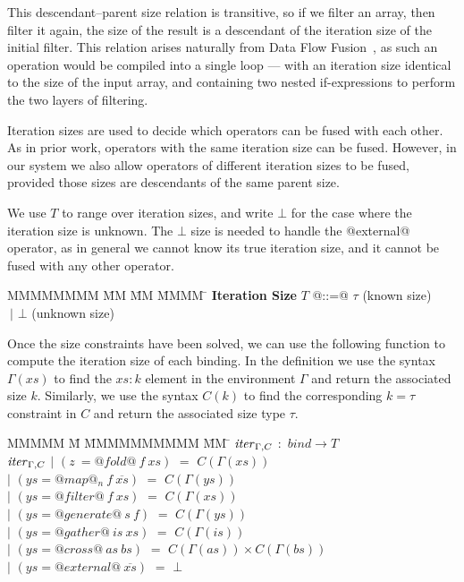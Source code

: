 This descendant--parent size relation is transitive, so if we filter an array, then filter it again, the size of the result is a descendant of the iteration size of the initial filter. This relation arises naturally from Data Flow Fusion~\cite{lippmeier2013flow}, as such an operation would be compiled into a single loop --- with an iteration size identical to the size of the input array, and containing two nested if-expressions to perform the two layers of filtering.

Iteration sizes are used to decide which operators can be fused with each other. As in prior work, operators with the same iteration size can be fused. However, in our system we also allow operators of different iteration sizes to be fused, provided those sizes are descendants of the same parent size.

We use $T$ to range over iteration sizes, and write $\bot$ for the case where the iteration size is unknown. The $\bot$ size is needed to handle the @external@ operator, as in general we cannot know its true iteration size, and it cannot be fused with any other operator.

\begin{tabbing}
MMMMMMMM \= MM       \= MM \= MMMM \= \kill
\textbf{Iteration Size}
 \> $T$         \> @::=@  \> $\tau$        \> (known size) \\
 \>             \> $~|$   \> $\bot$     \> (unknown size) \\
\end{tabbing}

Once the size constraints have been solved, we can use the following function to compute the iteration size of each binding. In the definition we use the syntax $\Gamma(xs)$ to find the $xs : k$ element in the environment $\Gamma$ and return the associated size $k$. Similarly, we use the syntax $C(k)$ to find the corresponding $k = \tau$ constraint in $C$ and return the associated size type $\tau$.


\begin{tabbing}
MMMMM \= M \= MMMMMMMMMM \= MM \= \kill
$\mathit{iter}_{\Gamma,C}$  
        \>$:$\> $bind \rightarrow T$ 
\\[1ex]
$\mathit{iter}_{\Gamma,C}$
        \> $|$  \> $(z~ = @fold@~ f~xs)$     
                \> $=$ \> $C(\Gamma(xs))$ 
\\
        \> $|$  \> $(ys = @map@_n~f~\overline{xs})$
                \> $=$ \> $C(\Gamma(ys))$ 
\\
        \> $|$  \> $(ys = @filter@~f~xs)$    
                \> $=$ \> $C(\Gamma(xs))$ 
\\
        \> $|$  \> $(ys = @generate@~s~f)$  
                \> $=$ \> $C(\Gamma(ys))$ 
\\
        \> $|$  \> $(ys = @gather@~is~xs)$    
                \> $=$ \> $C(\Gamma(is))$ 
\\
        \> $|$  \> $(ys = @cross@~as~bs)$     
                \> $=$ \> $C(\Gamma(as)) \times C(\Gamma(bs))$ 
\\
        \> $|$  \> $(ys = @external@~\overline{xs})$  
                \> $=$ \> $\bot$ 
\\
\end{tabbing}


